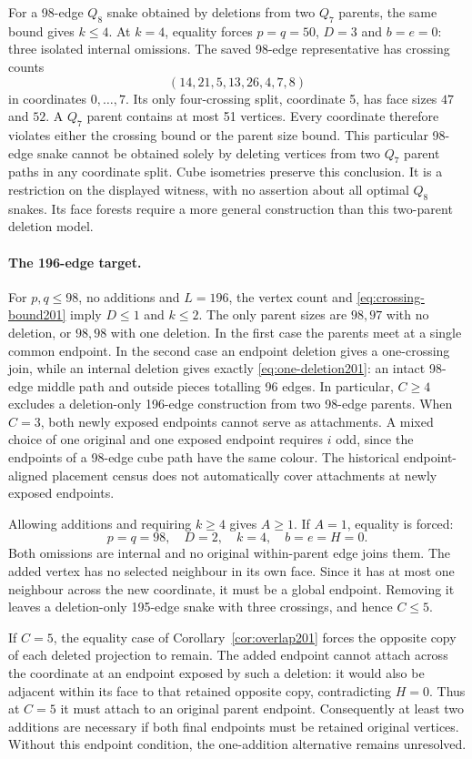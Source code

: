 \documentclass[11pt,a4paper]{article}
\theoremstyle{definition}
\theoremstyle{remark}
\begin{document}
For a 98-edge $Q_8$ snake obtained by deletions from two $Q_7$ parents,
the same bound gives $k\le4$. At $k=4$, equality forces $p=q=50$,
$D=3$ and $b=e=0$: three isolated internal omissions.
The saved 98-edge representative has crossing counts
\[
(14,21,5,13,26,4,7,8)
\]
in coordinates $0,\ldots,7$. Its only four-crossing split, coordinate
5, has face sizes $47$ and $52$. A $Q_7$ parent contains at most 51
vertices. Every coordinate therefore violates either the crossing bound
or the parent size bound. This particular 98-edge snake cannot be
obtained solely by deleting vertices from two $Q_7$ parent paths in
any coordinate split. Cube isometries preserve this conclusion.
It is a restriction on the displayed witness, with no assertion about
all optimal $Q_8$ snakes. Its face forests require a more general
construction than this two-parent deletion model.

\paragraph{The 196-edge target.}
For $p,q\le98$, no additions and $L=196$, the vertex count and
\eqref{eq:crossing-bound201} imply $D\le1$ and $k\le2$.
The only parent sizes are $98,97$ with no deletion, or $98,98$ with
one deletion. In the first case the parents meet at a single common
endpoint. In the second case an endpoint deletion gives a one-crossing
join, while an internal deletion gives exactly
\eqref{eq:one-deletion201}: an intact 98-edge middle path and outside
pieces totalling 96 edges. In particular, $C\ge4$ excludes a
deletion-only 196-edge construction from two 98-edge parents.
When $C=3$, both newly exposed endpoints cannot serve as attachments.
A mixed choice of one original and one exposed endpoint requires $i$
odd, since the endpoints of a 98-edge cube path have the same colour.
The historical endpoint-aligned placement census does not automatically
cover attachments at newly exposed endpoints.

Allowing additions and requiring $k\ge4$ gives $A\ge1$.
If $A=1$, equality is forced:
\[
p=q=98,\quad D=2,\quad k=4,\quad b=e=H=0.
\]
Both omissions are internal and no original within-parent edge joins
them. The added vertex has no selected neighbour in its own face.
Since it has at most one neighbour across the new coordinate, it must
be a global endpoint. Removing it leaves a deletion-only 195-edge
snake with three crossings, and hence $C\le5$.

If $C=5$, the equality case of Corollary~\ref{cor:overlap201}
forces the opposite copy of each deleted projection to remain.
The added endpoint cannot attach across the coordinate at an endpoint
exposed by such a deletion: it would also be adjacent within its face
to that retained opposite copy, contradicting $H=0$.
Thus at $C=5$ it must attach to an original parent endpoint.
Consequently at least two additions are necessary if both final
endpoints must be retained original vertices. Without this endpoint
condition, the one-addition alternative remains unresolved.
\end{document}

